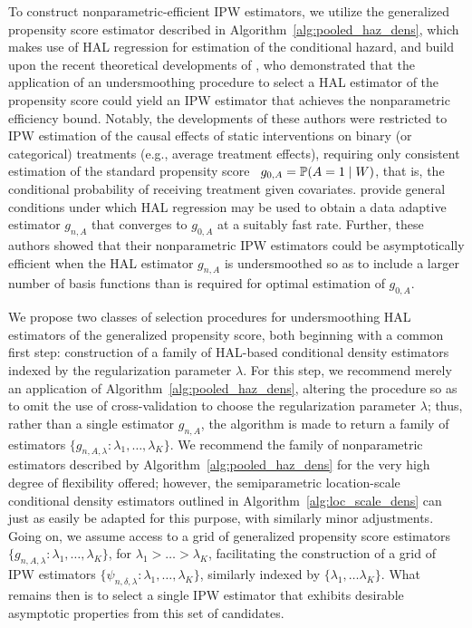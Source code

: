 To construct nonparametric-efficient IPW estimators, we utilize the generalized
propensity score estimator described in Algorithm~\ref{alg:pooled_haz_dens},
which makes use of HAL regression for estimation of the conditional hazard, and
build upon the recent theoretical developments of
\citet{ertefaie2020nonparametric}, who demonstrated that the application of an
undersmoothing procedure to select a HAL estimator of the propensity score could
yield an IPW estimator that achieves the nonparametric efficiency bound.
Notably, the developments of these authors were restricted to IPW estimation of
the causal effects of static interventions on binary (or categorical) treatments
(e.g., average treatment effects), requiring only consistent estimation of the
standard propensity score~\citep{rosenbaum1983central} $g_{0,A} = \mathbb{P}(A
= 1 \mid W)$, that is, the conditional probability of receiving treatment given
covariates. \citet{ertefaie2020nonparametric} provide general conditions under
which HAL regression may be used to obtain a data adaptive estimator $g_{n,A}$
that converges to $g_{0,A}$ at a suitably fast rate. Further, these authors
showed that their nonparametric IPW estimators could be asymptotically efficient
when the HAL estimator $g_{n,A}$ is undersmoothed so as to include a larger
number of basis functions than is required for optimal estimation of $g_{0,A}$.

We propose two classes of selection procedures for undersmoothing HAL estimators
of the generalized propensity score, both beginning with a common first step:
construction of a family of HAL-based conditional density estimators indexed by
the regularization parameter $\lambda$. For this step, we recommend merely an
application of Algorithm~\ref{alg:pooled_haz_dens}, altering the procedure so as
to omit the use of cross-validation to choose the regularization parameter
$\lambda$; thus, rather than a single estimator $g_{n,A}$, the algorithm is made
to return a family of estimators $\{g_{n,A,\lambda}: \lambda_1, \ldots,
\lambda_K\}$. We recommend the family of nonparametric estimators described by
Algorithm~\ref{alg:pooled_haz_dens} for the very high degree of flexibility
offered; however, the semiparametric location-scale conditional density
estimators outlined in Algorithm~\ref{alg:loc_scale_dens} can just as easily be
adapted for this purpose, with similarly minor adjustments. Going on, we assume
access to a grid of generalized propensity score estimators $\{g_{n,A,\lambda}:
\lambda_1, \ldots, \lambda_K\}$, for $\lambda_1 > \ldots > \lambda_K$,
facilitating the construction of a grid of IPW estimators
$\{\psi_{n,\delta,\lambda}: \lambda_1, \ldots, \lambda_K\}$, similarly indexed
by $\{\lambda_1, \ldots \lambda_K\}$. What remains then is to select a single
IPW estimator that exhibits desirable asymptotic properties from this set of
candidates.


